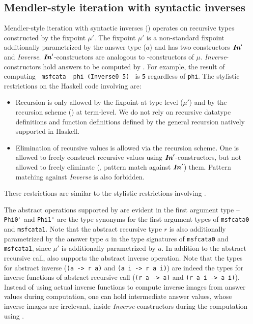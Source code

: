 \begin{figure}

\vspace*{-3ex}
\end{figure}


\subsection{Mendler-style iteration with syntactic inverses}
\label{sec:mendler:sf}
Mendler-style iteration with syntactic inverses (\msfit{}) operates on
recursive types constructed by the fixpoint $\mu'$. The fixpoint $\mu'$
is a non-standard fixpoint additionally parametrized by the answer type ($a$)
and has two constructors $\textbf{\textit{In}}_{}'$ and \textit{Inverse}. $\textbf{\textit{In}}_{}'$-constructors
are analogous to \In{}-constructors of $\mu$. \textit{Inverse}-constructors
hold answers to be computed by \msfit{}. For example,%
the result of computing \lstinline{ msfcata  phi (Inverse0 5) }
is \lstinline{5} regardless of \lstinline{phi}.
The stylistic restrictions on the Haskell code involving \msfit{} are:
\begin{itemize}
\item Recursion is only allowed by the fixpoint at type-level ($\mu'$)
and by the recursion scheme (\msfit{}) at term-level.
We do not rely on recursive datatype definitions and function definitions
defined by the general recursion natively supported in Haskell.
\item Elimination of recursive values is allowed via the recursion scheme.
One is allowed to freely construct recursive values using $\textbf{\textit{In}}_{}'$-constructors,
but not allowed to freely eliminate (\ie, pattern match against $\textbf{\textit{In}}_{}'$) them.
Pattern matching against \textit{Inverse} is also forbidden.
\end{itemize}
These restrictions are similar to the stylistic restrictions involving \MIt{}.


The abstract operations supported by \msfit{} are evident
in the first argument type -- \lstinline{Phi0'} and \lstinline{Phi1'}
are the type synonyms for the first argument types of \lstinline{msfcata0}
and \lstinline{msfcata1}. Note that the abstract recursive type $r$ is also
additionally parametrized by the answer type $a$ in the type signatures
of \lstinline{msfcata0} and \lstinline{msfcata1}, since $\mu'$ is additionally
parametrized by $a$. In addition to the abstract recursive call, \msfit{}
also supports the abstract inverse operation. Note that the types for
abstract inverse (\lstinline{(a -> r a)} and \lstinline{(a i -> r a i)})
are indeed the types for inverse functions of abstract recursive call
(\lstinline{(r a -> a)} and \lstinline{(r a i -> a i)}). Instead of using
actual inverse functions to compute inverse images from answer values
during computation, one can hold intermediate answer values, whose inverse
images are irrelevant, inside \textit{Inverse}-constructors during
the computation using \msfit{}.

